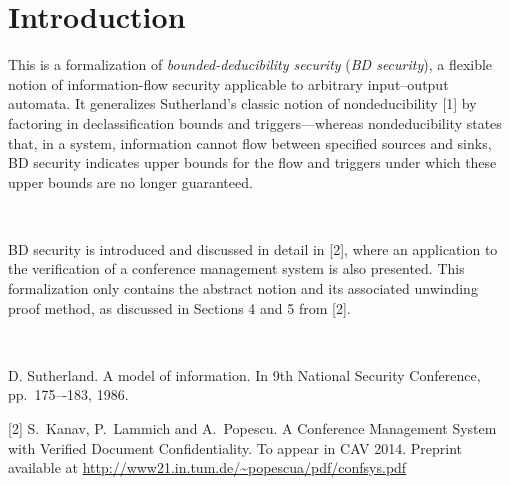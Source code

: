 
\section{Introduction}

This is a formalization of {\em bounded-deducibility security} ({\em BD security}), 
a flexible notion of information-flow security applicable to arbitrary input--output automata.  
It generalizes Sutherland's classic notion of 
nondeducibility [1] by factoring in declassification bounds and triggers---whereas nondeducibility 
states that, in a system, information cannot flow between specified sources and sinks, 
BD security indicates upper bounds for the flow and triggers under which these upper bounds 
are no longer guaranteed.  

\par \ \par
BD security is introduced and discussed in detail in [2], where an application to the verification of a conference management 
system is also presented. This formalization only contains the abstract notion and its associated unwinding proof method, 
as discussed in Sections 4 and 5 from [2].    


\par \ \par
[1] D. Sutherland. A model of information. In 9th National Security Conference, pp.\ 175–-183, 1986.

[2]  S.\ Kanav, P.\ Lammich and A.\ Popescu.  
A Conference Management System with Verified Document Confidentiality. To appear in CAV 2014.  
Preprint available at \url{http://www21.in.tum.de/~popescua/pdf/confsys.pdf}
